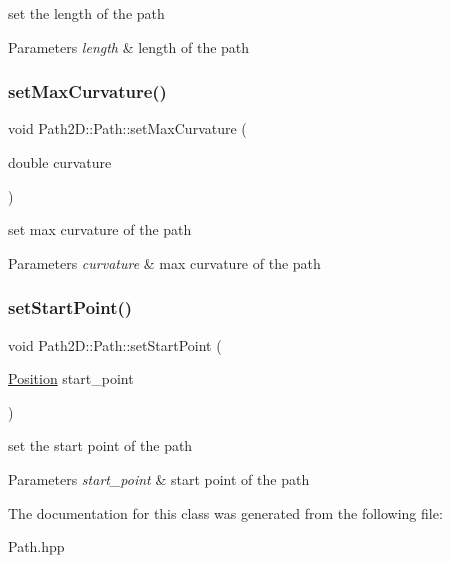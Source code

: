 set the length of the path 


\begin{DoxyParams}{Parameters}
{\em length} & length of the path \\
\hline
\end{DoxyParams}
\mbox{\label{class_path2_d_1_1_path_a52e9610d2c077a374bdf4d3bf7dd97e0}} 
\subsubsection{\texorpdfstring{set\+Max\+Curvature()}{setMaxCurvature()}}
{\footnotesize\ttfamily void Path2\+D\+::\+Path\+::set\+Max\+Curvature (\begin{DoxyParamCaption}\item[{double}]{curvature }\end{DoxyParamCaption})}



set max curvature of the path 


\begin{DoxyParams}{Parameters}
{\em curvature} & max curvature of the path \\
\hline
\end{DoxyParams}
\mbox{\label{class_path2_d_1_1_path_a7e21bacbade3e302c5db5499cee1428f}} 
\subsubsection{\texorpdfstring{set\+Start\+Point()}{setStartPoint()}}
{\footnotesize\ttfamily void Path2\+D\+::\+Path\+::set\+Start\+Point (\begin{DoxyParamCaption}\item[{\mbox{\hyperlink{class_path2_d_1_1_element_1_1_position}{Position}}}]{start\+\_\+point }\end{DoxyParamCaption})}



set the start point of the path 


\begin{DoxyParams}{Parameters}
{\em start\+\_\+point} & start point of the path \\
\hline
\end{DoxyParams}


The documentation for this class was generated from the following file\+:\begin{DoxyCompactItemize}
\item 
Path.\+hpp\end{DoxyCompactItemize}
